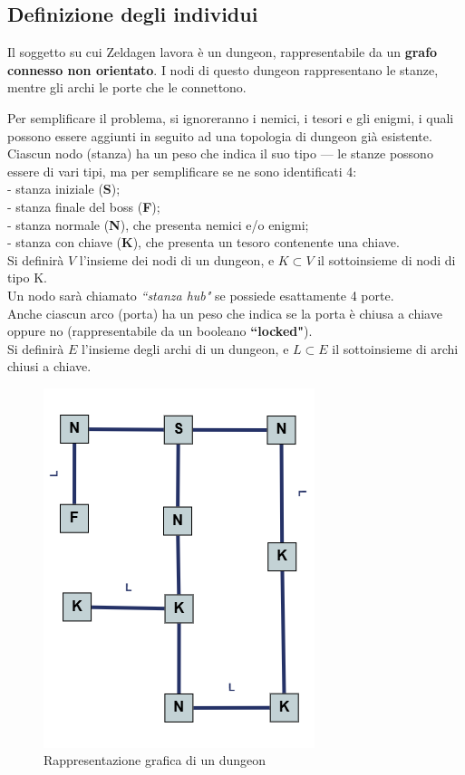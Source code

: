 \documentclass[12pt,titlepage]{article}
\begin{document}
\subsection {Definizione degli individui}

Il soggetto su cui Zeldagen lavora è un dungeon, rappresentabile da un \textbf{grafo connesso non orientato}.
I nodi di questo dungeon rappresentano le stanze, mentre gli archi le porte che le connettono.

Per semplificare il problema, si ignoreranno i nemici, i tesori e gli enigmi, i quali possono essere aggiunti in seguito ad una topologia di dungeon già esistente.\\

\noindent Ciascun nodo (stanza) ha un peso che indica il suo tipo --- le stanze possono essere di vari tipi, ma per semplificare se ne sono identificati 4:\\
- stanza iniziale (\textbf{S});\\
- stanza finale del boss (\textbf{F});\\
- stanza normale (\textbf{N}), che presenta nemici e/o enigmi;\\
- stanza con chiave (\textbf{K}), che presenta un tesoro contenente una chiave.\\
Si definirà $V$ l'insieme dei nodi di un dungeon, e $K \subset V$ il sottoinsieme di nodi di tipo K.\\
Un nodo sarà chiamato \textit{``stanza hub"} se possiede esattamente 4 porte.\\

\noindent Anche ciascun arco (porta) ha un peso che indica se la porta è chiusa a chiave oppure no (rappresentabile da un booleano \textbf{``locked"}).\\
Si definirà $E$ l'insieme degli archi di un dungeon, e $L \subset E$ il sottoinsieme di archi chiusi a chiave.\\

\begin{figure}[H]
    \centering
    \includegraphics[width=0.33\linewidth]{assets/dungeon-graph-example.png}
    \caption{Rappresentazione grafica di un dungeon}
\end{figure}
\end{document}
